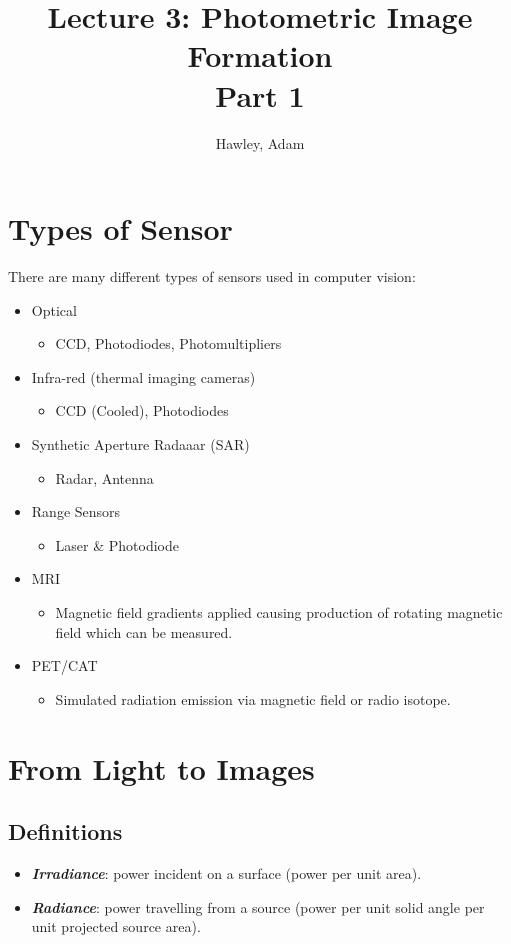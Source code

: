 \documentclass{article}
\begin{document}
\author{Hawley, Adam}
\title{Lecture 3: Photometric Image Formation\\Part 1}
\maketitle
\section{Types of Sensor}
There are many different types of sensors used in computer vision:
\begin{itemize}
	\item Optical
	\begin{itemize} \item CCD, Photodiodes, Photomultipliers \end{itemize}
	\item Infra-red (thermal imaging cameras)
	\begin{itemize} \item CCD (Cooled), Photodiodes \end{itemize}
	\item Synthetic Aperture Radaaar (SAR)
	\begin{itemize} \item Radar, Antenna \end{itemize}
	\item Range Sensors
	\begin{itemize} \item Laser \& Photodiode \end{itemize}
	\item MRI
	\begin{itemize} \item Magnetic field gradients applied causing production of rotating magnetic field which can be measured. \end{itemize}
	\item PET/CAT
	\begin{itemize} \item Simulated radiation emission via magnetic field or radio isotope. \end{itemize}
\end{itemize}
\section{From Light to Images}
\subsection{Definitions}
\begin{itemize}
	\item {\textit{\textbf {Irradiance}}}: power incident on a surface (power per unit area).
	\item {\textit{\textbf {Radiance}}}: power travelling from a source (power per unit solid angle per unit projected source area).
\end{itemize}
\end{document}
